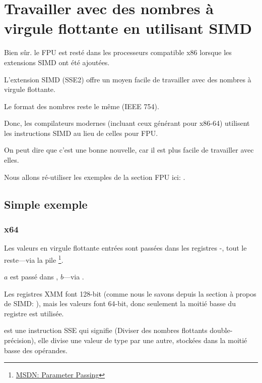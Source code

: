 \section{Travailler avec des nombres à virgule flottante en utilisant SIMD}

\label{floating_SIMD}

Bien sûr. le \ac{FPU} est resté dans les processeurs compatible x86 lorsque les extensions
\ac{SIMD} ont été ajoutées.

L'extension \ac{SIMD} (SSE2) offre un moyen facile de travailler avec des nombres
à virgule flottante.

Le format des nombres reste le même (IEEE 754).

Donc, les compilateurs modernes (incluant ceux générant pour x86-64) utilisent les
instructions \ac{SIMD} au lieu de celles pour FPU.

On peut dire que c'est une bonne nouvelle, car il est plus facile de travailler avec
elles.

Nous allons ré-utiliser les exemples de la section FPU ici: .

\subsection{Simple exemple}



\subsubsection{x64}



Les valeurs en virgule flottante entrées sont passées dans les registres -,
tout le reste---via la pile
\footnote{\href{http://go.yurichev.com/17263}{MSDN: Parameter Passing}}.

$a$ est passé dans , $b$---via .

Les registres XMM font 128-bit (comme nous le savons depuis la section à propos de
\ac{SIMD}: ), mais les valeurs \Tdouble font 64-bit, donc seulement
la moitié basse du registre est utilisée.

 est une instruction SSE qui signifie  (Diviser des nombres flottants double-précision), elle divise
une valeur de type \Tdouble par une autre, stockées dans la moitié basse des opérandes.


